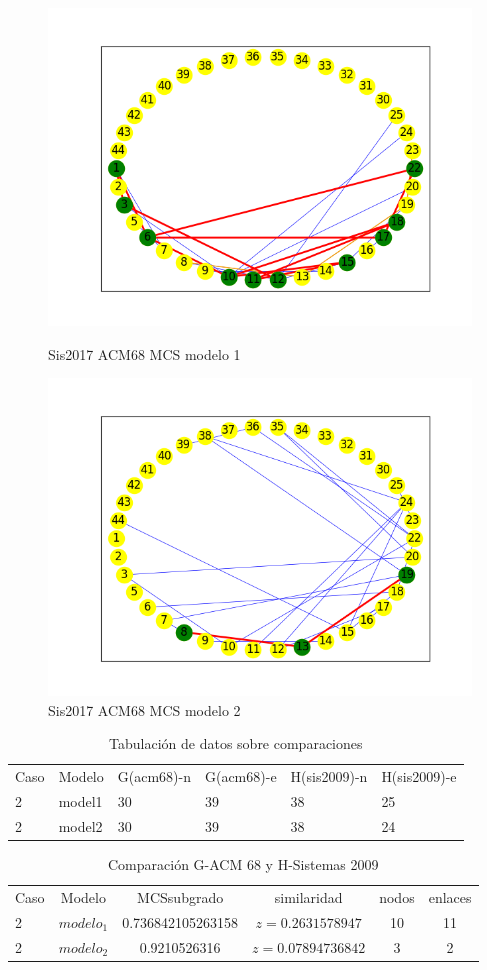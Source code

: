 \begin{figure}[H]
\centering
\includegraphics[width=0.7\linewidth]{images/sis2018/H_sis2018_acm68_m1_mcs_mix}
\caption{Sis2017 ACM68 MCS modelo 1}
\label{fig:c2p2modelo1}


\includegraphics[width=0.7\linewidth]{images/sis2018/H_sis2018_acm68_m2_mcs_mix}
\caption{Sis2017 ACM68 MCS modelo 2}
\label{fig:c2p2modelo2}

\end{figure}


\begin{table}[H]
\centering
\caption{Tabulación de datos sobre comparaciones}
\begin{tabular}[t]{|l|l|l|l|l|l|}
\hline
Caso & Modelo & G(acm68)-n & G(acm68)-e & H(sis2009)-n & H(sis2009)-e\\
2&model1&30&39&38&25\\
\hline
2&model2&30&39&38&24\\
\hline
\end{tabular}
\label{tab:tabcomparaciones_C2_P2}
\end{table}


\begin{table}[H]
\centering
\caption{Comparación G-ACM 68 y H-Sistemas 2009}
\begin{tabular}[t]{lccccc}
\hline
Caso & Modelo & MCSsubgrado & similaridad & nodos & enlaces \\
2 & $modelo_1$ & 0.736842105263158 & $z=0.2631578947$ & 10 & 11\\
2 & $modelo_2$ & 0.9210526316 & $z=0.07894736842$ & 3 & 2\\
\hline
\end{tabular}
\label{tab:tabcomparaciones_C2_P2}
\end{table}

